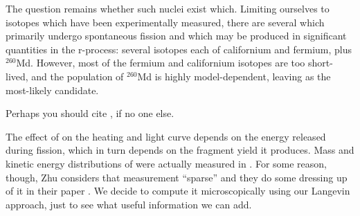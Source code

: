 The question remains whether such nuclei exist which. Limiting ourselves to isotopes which have been experimentally measured, there are several which primarily undergo spontaneous fission and which may be produced in significant quantities in the r-process: several isotopes each of californium and fermium, plus $^{260}$Md. However, most of the fermium and californium isotopes are too short-lived, and the population of $^{260}$Md is highly model-dependent, leaving {\Cf} as the most-likely candidate.

Perhaps you should cite \cite{Zhu2018}, if no one else.

The effect of {\Cf} on the heating and light curve depends on the energy released during fission, which in turn depends on the fragment yield it produces. Mass and kinetic energy distributions of {\Cf} were actually measured in \cite{Brandt1963}. For some reason, though, Zhu considers that measurement ``sparse'' and they do some dressing up of it in their paper \cite{Zhu2018}. We decide to compute it microscopically using our Langevin approach, just to see what useful information we can add.



%
%


